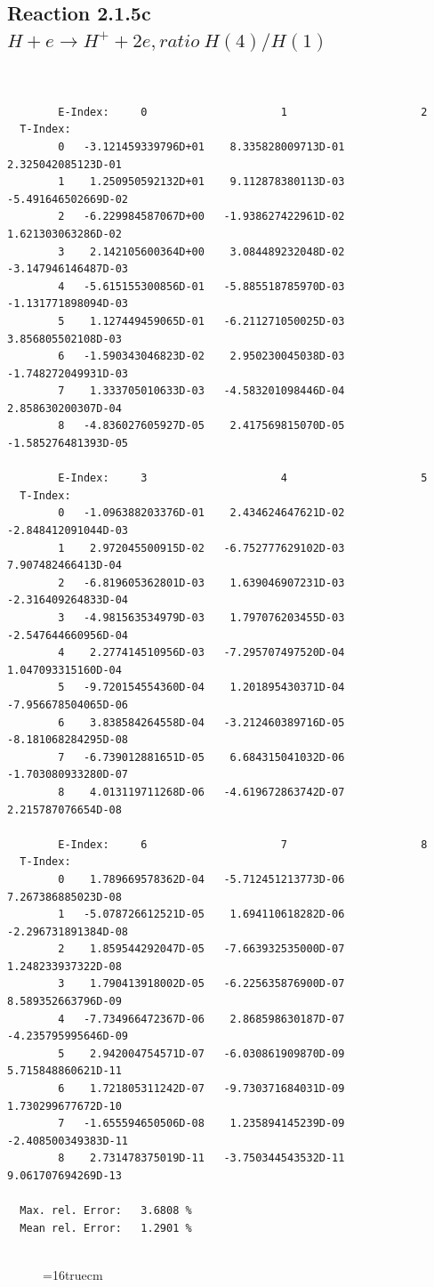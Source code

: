\documentclass[12pt,dvips]{article}
\begin{document}
\newpage
\subsection{
Reaction 2.1.5c  $H + e \rightarrow H^+ + 2e, ratio~ H(4)/H(1)$
}


\begin{small}\begin{verbatim}


        E-Index:     0                     1                     2
  T-Index:
        0   -3.121459339796D+01    8.335828009713D-01    2.325042085123D-01
        1    1.250950592132D+01    9.112878380113D-03   -5.491646502669D-02
        2   -6.229984587067D+00   -1.938627422961D-02    1.621303063286D-02
        3    2.142105600364D+00    3.084489232048D-02   -3.147946146487D-03
        4   -5.615155300856D-01   -5.885518785970D-03   -1.131771898094D-03
        5    1.127449459065D-01   -6.211271050025D-03    3.856805502108D-03
        6   -1.590343046823D-02    2.950230045038D-03   -1.748272049931D-03
        7    1.333705010633D-03   -4.583201098446D-04    2.858630200307D-04
        8   -4.836027605927D-05    2.417569815070D-05   -1.585276481393D-05

        E-Index:     3                     4                     5
  T-Index:
        0   -1.096388203376D-01    2.434624647621D-02   -2.848412091044D-03
        1    2.972045500915D-02   -6.752777629102D-03    7.907482466413D-04
        2   -6.819605362801D-03    1.639046907231D-03   -2.316409264833D-04
        3   -4.981563534979D-03    1.797076203455D-03   -2.547644660956D-04
        4    2.277414510956D-03   -7.295707497520D-04    1.047093315160D-04
        5   -9.720154554360D-04    1.201895430371D-04   -7.956678504065D-06
        6    3.838584264558D-04   -3.212460389716D-05   -8.181068284295D-08
        7   -6.739012881651D-05    6.684315041032D-06   -1.703080933280D-07
        8    4.013119711268D-06   -4.619672863742D-07    2.215787076654D-08

        E-Index:     6                     7                     8
  T-Index:
        0    1.789669578362D-04   -5.712451213773D-06    7.267386885023D-08
        1   -5.078726612521D-05    1.694110618282D-06   -2.296731891384D-08
        2    1.859544292047D-05   -7.663932535000D-07    1.248233937322D-08
        3    1.790413918002D-05   -6.225635876900D-07    8.589352663796D-09
        4   -7.734966472367D-06    2.868598630187D-07   -4.235795995646D-09
        5    2.942004754571D-07   -6.030861909870D-09    5.715848860621D-11
        6    1.721805311242D-07   -9.730371684031D-09    1.730299677672D-10
        7   -1.655594650506D-08    1.235894145239D-09   -2.408500349383D-11
        8    2.731478375019D-11   -3.750344543532D-11    9.061707694269D-13

  Max. rel. Error:   3.6808 %
  Mean rel. Error:   1.2901 %


\end{verbatim}\end{small}
\begin{figure} \label{2.1.5c}
\epsfxsize=16truecm
\end{figure}
\end{document}
